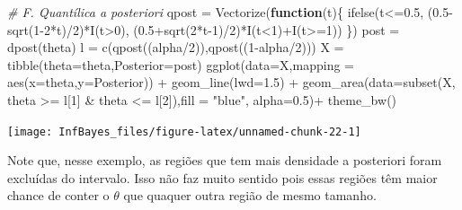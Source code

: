 \documentclass[
]{book}
\newenvironment{Shaded}{\begin{snugshade}}{\end{snugshade}}
\newcommand{\AttributeTok}[1]{\textcolor[rgb]{0.77,0.63,0.00}{#1}}
\newcommand{\CommentTok}[1]{\textcolor[rgb]{0.56,0.35,0.01}{\textit{#1}}}
\newcommand{\ControlFlowTok}[1]{\textcolor[rgb]{0.13,0.29,0.53}{\textbf{#1}}}
\newcommand{\DecValTok}[1]{\textcolor[rgb]{0.00,0.00,0.81}{#1}}
\newcommand{\FloatTok}[1]{\textcolor[rgb]{0.00,0.00,0.81}{#1}}
\newcommand{\FunctionTok}[1]{\textcolor[rgb]{0.00,0.00,0.00}{#1}}
\newcommand{\NormalTok}[1]{#1}
\newcommand{\OtherTok}[1]{\textcolor[rgb]{0.56,0.35,0.01}{#1}}
\newcommand{\SpecialCharTok}[1]{\textcolor[rgb]{0.00,0.00,0.00}{#1}}
\newcommand{\StringTok}[1]{\textcolor[rgb]{0.31,0.60,0.02}{#1}}
\begin{document}
\begin{Shaded}
\begin{Highlighting}[]
\CommentTok{\# F. Quantílica a posteriori}
\NormalTok{qpost }\OtherTok{=} \FunctionTok{Vectorize}\NormalTok{(}\ControlFlowTok{function}\NormalTok{(t)\{ }\FunctionTok{ifelse}\NormalTok{(t}\SpecialCharTok{\textless{}=}\FloatTok{0.5}\NormalTok{, (}\FloatTok{0.5}\SpecialCharTok{{-}}\FunctionTok{sqrt}\NormalTok{(}\DecValTok{1{-}2}\SpecialCharTok{*}\NormalTok{t)}\SpecialCharTok{/}\DecValTok{2}\NormalTok{)}\SpecialCharTok{*}\FunctionTok{I}\NormalTok{(t}\SpecialCharTok{\textgreater{}}\DecValTok{0}\NormalTok{),}
\NormalTok{    (}\FloatTok{0.5}\SpecialCharTok{+}\FunctionTok{sqrt}\NormalTok{(}\DecValTok{2}\SpecialCharTok{*}\NormalTok{t}\DecValTok{{-}1}\NormalTok{)}\SpecialCharTok{/}\DecValTok{2}\NormalTok{)}\SpecialCharTok{*}\FunctionTok{I}\NormalTok{(t}\SpecialCharTok{\textless{}}\DecValTok{1}\NormalTok{)}\SpecialCharTok{+}\FunctionTok{I}\NormalTok{(t}\SpecialCharTok{\textgreater{}=}\DecValTok{1}\NormalTok{)) \})}
\NormalTok{post }\OtherTok{=} \FunctionTok{dpost}\NormalTok{(theta)}
\NormalTok{l }\OtherTok{=} \FunctionTok{c}\NormalTok{(}\FunctionTok{qpost}\NormalTok{((alpha}\SpecialCharTok{/}\DecValTok{2}\NormalTok{)),}\FunctionTok{qpost}\NormalTok{((}\DecValTok{1}\SpecialCharTok{{-}}\NormalTok{alpha}\SpecialCharTok{/}\DecValTok{2}\NormalTok{)))}
\NormalTok{X }\OtherTok{=} \FunctionTok{tibble}\NormalTok{(}\AttributeTok{theta=}\NormalTok{theta,}\AttributeTok{Posterior=}\NormalTok{post)}
\FunctionTok{ggplot}\NormalTok{(}\AttributeTok{data=}\NormalTok{X,}\AttributeTok{mapping =} \FunctionTok{aes}\NormalTok{(}\AttributeTok{x=}\NormalTok{theta,}\AttributeTok{y=}\NormalTok{Posterior)) }\SpecialCharTok{+}
  \FunctionTok{geom\_line}\NormalTok{(}\AttributeTok{lwd=}\FloatTok{1.5}\NormalTok{) }\SpecialCharTok{+}
  \FunctionTok{geom\_area}\NormalTok{(}\AttributeTok{data=}\FunctionTok{subset}\NormalTok{(X, theta }\SpecialCharTok{\textgreater{}=}\NormalTok{ l[}\DecValTok{1}\NormalTok{] }\SpecialCharTok{\&}\NormalTok{ theta }\SpecialCharTok{\textless{}=}\NormalTok{ l[}\DecValTok{2}\NormalTok{]),}\AttributeTok{fill =} \StringTok{"blue"}\NormalTok{, }\AttributeTok{alpha=}\FloatTok{0.5}\NormalTok{)}\SpecialCharTok{+}
  \FunctionTok{theme\_bw}\NormalTok{()}
\end{Highlighting}
\end{Shaded}

\begin{center}\texttt{[image: InfBayes\_files/figure-latex/unnamed-chunk-22-1]} \end{center}

Note que, nesse exemplo, as regiões que tem mais densidade a posteriori foram excluídas do intervalo. Isso não faz muito sentido pois essas regiões têm maior chance de conter o \(\theta\) que quaquer outra região de mesmo tamanho.
\end{document}

